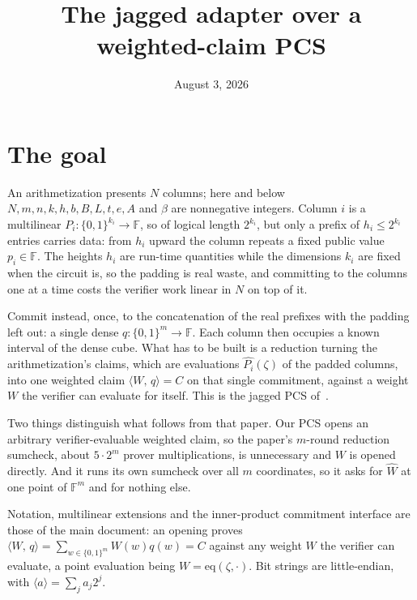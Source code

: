 \documentclass[11pt]{article}
\title{\textbf{The jagged adapter over a weighted-claim PCS}}
\author{}
\date{August 3, 2026}
\newcommand{\F}{\mathbb{F}}
\newcommand{\eq}{\mathrm{eq}}
\newcommand{\cube}[1]{\{0,1\}^{#1}}
\newcommand{\pol}[1]{\widehat{#1}}
\newcommand{\inner}[2]{\langle #1,\, #2 \rangle}
\newcommand{\val}[1]{\langle #1 \rangle}
\theoremstyle{plain}
\begin{document}
\maketitle

\begin{center}
\end{center}

\section{The goal}\label{sec:goal}

An arithmetization presents $N$ columns; here and below $N,m,n,k,h,b,B,L,t,e,A$ and $\beta$
are nonnegative integers. Column $i$ is a multilinear
$P_i:\cube{k_i}\to\F$, so of logical length $2^{k_i}$, but only a prefix of $h_i\le2^{k_i}$
entries carries data: from $h_i$ upward the column repeats a fixed public value $p_i\in\F$.
The heights $h_i$ are run-time quantities while the dimensions $k_i$ are fixed when the
circuit is, so the padding is real waste, and committing to the columns one at a time costs
the verifier work linear in $N$ on top of it.

Commit instead, once, to the concatenation of the real prefixes with the padding left out: a
single dense $q:\cube m\to\F$. Each column then occupies a known interval of the dense cube. What has to be built is a reduction turning the
arithmetization's claims, which are evaluations $\pol{P_i}(\zeta)$ of the padded columns, into
one weighted claim $\inner Wq=C$ on that single commitment, against a weight $W$ the verifier
can evaluate for itself. This is the jagged PCS of~\cite{jagged}.

Two things distinguish what follows from that paper. Our PCS opens an arbitrary
verifier-evaluable weighted claim, so the paper's $m$-round reduction sumcheck, about
$5\cdot2^m$ prover multiplications, is unnecessary and $W$ is opened directly. And it runs its
own sumcheck over all $m$ coordinates, so it asks for $\pol W$ at one point of $\F^m$ and for
nothing else.

Notation, multilinear extensions and the inner-product commitment interface are those of the
main document: an opening proves $\inner Wq=\sum_{w\in\cube m}W(w)q(w)=C$ against any weight
$W$ the verifier can evaluate, a point evaluation being $W=\eq(\zeta,\cdot)$. Bit strings are
little-endian, with $\val a=\sum_j a_j2^j$.
\end{document}

